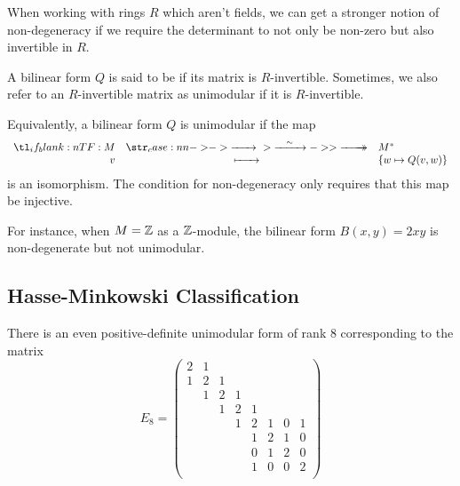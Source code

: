 When working with rings $R$ which aren't fields, we can get a stronger notion of non-degeneracy if we require the determinant to not only be non-zero but also invertible in $R$.

\begin{definition}
	A bilinear form $Q$ is said to be  if its matrix is $R$-invertible. Sometimes, we also refer to an $R$-invertible matrix as unimodular if it is $R$-invertible.
\end{definition}

Equivalently, a bilinear form $Q$ is unimodular if the map
\[
	\lkxfunc{}{M}{M^\d}{v}{\left\{w\mapsto Q(v,w)\right\}}
\]
is an isomorphism. The condition for non-degeneracy only requires that this map be injective.

\begin{example}
	For instance, when $M=\mathbb{Z}$ as a $\mathbb{Z}$-module, the bilinear form $B(x,y)=2xy$ is non-degenerate but not unimodular.
\end{example}

\subsection*{Hasse-Minkowski Classification}

\begin{proposition}
	There is an even positive-definite unimodular form of rank $8$ corresponding to the matrix
	\[
		E_8 = \begin{pmatrix}
			2 & 1 &   &   &   &   &   &   \\
			1 & 2 & 1 &   &   &   &   &   \\
			  & 1 & 2 & 1 &   &   &   &   \\
			  &   & 1 & 2 & 1 &   &   &   \\
			  &   &   & 1 & 2 & 1 & 0 & 1 \\
			  &   &   &   & 1 & 2 & 1 & 0 \\
			  &   &   &   & 0 & 1 & 2 & 0 \\
			  &   &   &   & 1 & 0 & 0 & 2 \\
		\end{pmatrix}
	\]
\end{proposition}

%
\begin{definition}
\end{definition}

